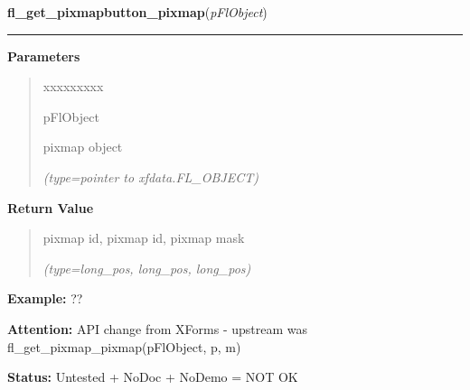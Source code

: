 \hspace{.8\funcindent}\begin{boxedminipage}{\funcwidth}

    \raggedright \textbf{fl\_get\_pixmapbutton\_pixmap}(\textit{pFlObject})

    \vspace{-1.5ex}

    \rule{\textwidth}{0.5\fboxrule}
\setlength{\parskip}{2ex}
\setlength{\parskip}{1ex}
      \textbf{Parameters}
      \vspace{-1ex}

      \begin{quote}
        \begin{Ventry}{xxxxxxxxx}

          \item[pFlObject]

          pixmap object

            {\it (type=pointer to xfdata.FL\_OBJECT)}

        \end{Ventry}

      \end{quote}

      \textbf{Return Value}
    \vspace{-1ex}

      \begin{quote}
      pixmap id, pixmap id, pixmap mask

      {\it (type=long\_pos, long\_pos, long\_pos)}

      \end{quote}

\textbf{Example:} ??



\textbf{Attention:} API change from XForms - upstream was fl\_get\_pixmap\_pixmap(pFlObject, p,
m)



\textbf{Status:} Untested + NoDoc + NoDemo = NOT OK



    \end{boxedminipage}

    \label{xformslib:flbitmap:fl_read_pixmapfile}

    \vspace{0.5ex}


